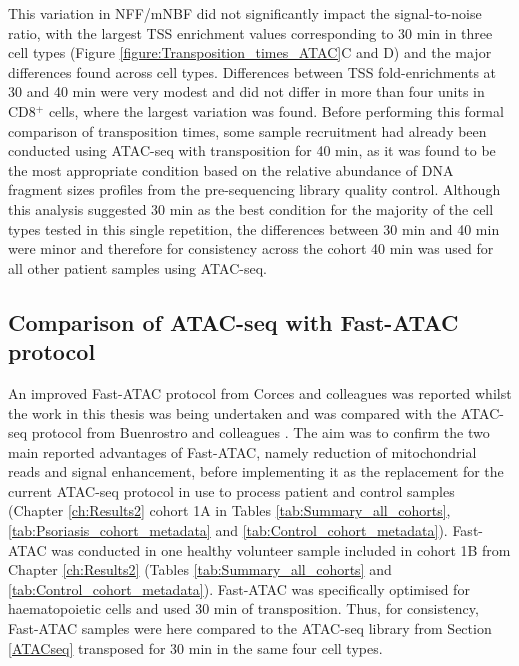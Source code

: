This variation in NFF/mNBF did not significantly impact the signal-to-noise ratio, with the largest TSS enrichment values corresponding to 30 min in three cell types (Figure \ref{figure:Transposition_times_ATAC}C and D) and the major differences found across cell types. Differences between TSS fold-enrichments at 30 and 40 min were very modest and did not differ in more than four units in CD8$^+$ cells, where the largest variation was found. Before performing this formal comparison of transposition times, some sample recruitment had already been conducted using ATAC-seq with transposition for 40 min, as it was found to be the most appropriate condition based on the relative abundance of DNA fragment sizes profiles from the pre-sequencing library quality control. Although this analysis suggested 30 min as the best condition for the majority of the cell types tested in this single repetition, the differences between 30 min and 40 min were minor and therefore for consistency across the cohort 40 min was used for all other patient samples using ATAC-seq. 




\subsection{Comparison of ATAC-seq with Fast-ATAC protocol}
\label{Fast_ATAC}

An improved Fast-ATAC protocol from Corces and colleagues \parencite{Corces2016} was reported whilst the work in this thesis was being undertaken and was compared with the ATAC-seq protocol from Buenrostro and colleagues \parencite{Buenrostro2013}. The aim was to confirm the two main reported advantages of Fast-ATAC, namely reduction of mitochondrial reads and signal enhancement, before implementing it as the replacement for the current ATAC-seq protocol in use to process patient and control samples (Chapter \ref{ch:Results2} cohort 1A in Tables \ref{tab:Summary_all_cohorts}, \ref{tab:Psoriasis_cohort_metadata} and \ref{tab:Control_cohort_metadata}). Fast-ATAC was conducted in one healthy volunteer sample included in cohort 1B from Chapter \ref{ch:Results2} (Tables \ref{tab:Summary_all_cohorts} and \ref{tab:Control_cohort_metadata}). Fast-ATAC was specifically optimised for haematopoietic cells and used 30 min of transposition. Thus, for consistency, Fast-ATAC samples were here compared to the ATAC-seq library from Section \ref{ATACseq} transposed for 30 min in the same four cell types.


